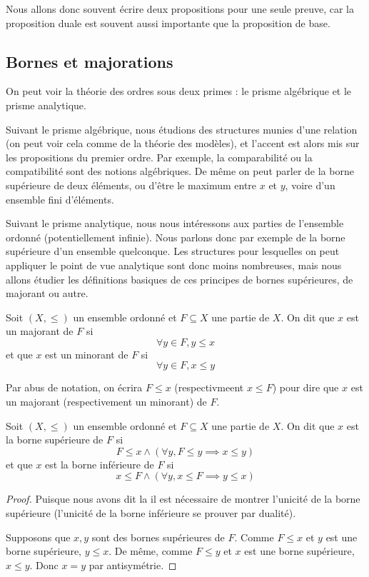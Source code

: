 Nous allons donc souvent écrire deux propositions pour une seule preuve, car la
proposition duale est souvent aussi importante que la proposition de base.

\subsection{Bornes et majorations}

On peut voir la théorie des ordres sous deux primes : le prisme algébrique et le
prisme analytique.

Suivant le prisme algébrique, nous étudions des structures
munies d'une relation (on peut voir cela comme de la théorie des modèles), et
l'accent est alors mis sur les propositions du premier ordre. Par exemple,
la comparabilité ou la compatibilité sont des notions algébriques. De même on
peut parler de la borne supérieure de deux éléments, ou d'être le maximum entre
$x$ et $y$, voire d'un ensemble fini d'éléments.

Suivant le prisme analytique, nous nous intéressons aux parties de l'ensemble
ordonné (potentiellement infinie). Nous parlons donc par exemple de la borne
supérieure d'un ensemble quelconque. Les structures pour lesquelles on peut
appliquer le point de vue analytique sont donc moins nombreuses, mais nous
allons étudier les définitions basiques de ces principes de bornes supérieures,
de majorant ou autre.

\begin{definition}
  Soit $(X,\leq)$ un ensemble ordonné et $F\subseteq X$ une partie de $X$. On
  dit que $x$ est un majorant de $F$ si
  \[\forall y\in F, y \leq x\]
  et que $x$ est un minorant de $F$ si
  \[\forall y\in F, x \leq y\]

  Par abus de notation, on écrira $F\leq x$ (respectivmeent $x\leq F$) pour dire
  que $x$ est un majorant (respectivement un minorant) de $F$.
\end{definition}

\begin{definition}
  Soit $(X,\leq)$ un ensemble ordonné et $F\subseteq X$ une partie de $X$. On
  dit que $x$ est la borne supérieure de $F$ si
  \[F\leq x \land (\forall y, F\leq y \implies x \leq y)\]
  et que $x$ est la borne inférieure de $F$ si
  \[x\leq F \land (\forall y, x\leq F \implies y \leq x)\]
\end{definition}

\begin{proof}
  Puisque nous avons dit \og la\fg{} il est nécessaire de montrer l'unicité de
  la borne supérieure (l'unicité de la borne inférieure se prouver par dualité).

  Supposons que $x,y$ sont des bornes supérieures de $F$. Comme $F\leq x$ et
  $y$ est une borne supérieure, $y\leq x$. De même, comme $F\leq y$ et $x$ est
  une borne supérieure, $x\leq y$. Donc $x = y$ par antisymétrie.
\end{proof}

